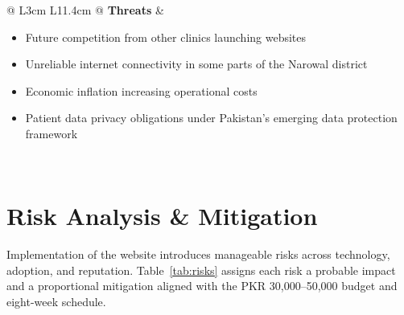 \documentclass[12pt, a4paper]{article}
\begin{document}
\begin{longtable}{@{} L{3cm} L{11.4cm} @{}}
\textbf{Threats} &
\begin{itemize}[leftmargin=1em, topsep=2pt, itemsep=2pt]
    \item Future competition from other clinics launching websites
    \item Unreliable internet connectivity in some parts of the Narowal district
    \item Economic inflation increasing operational costs
    \item Patient data privacy obligations under Pakistan's emerging data protection framework
\end{itemize} \\
\bottomrule
\caption{SWOT Analysis — Al-Haseeb Medical Health Care Center SKG}
\end{longtable}

\newpage

\section{Risk Analysis \& Mitigation}

Implementation of the website introduces manageable risks across technology, adoption, and reputation. Table~\ref{tab:risks} assigns each risk a probable impact and a proportional mitigation aligned with the PKR 30,000--50,000 budget and eight-week schedule.
\end{document}
